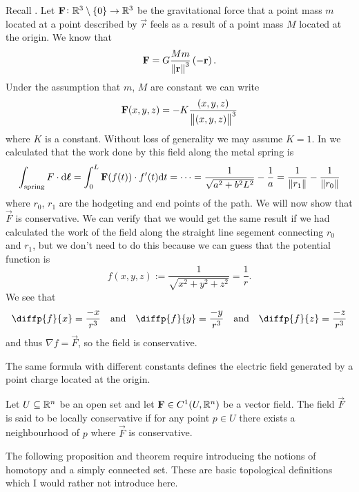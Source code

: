 \documentclass[11pt,a4paper]{article}
\begin{document}
\begin{example}
  Recall .
  Let $\boldsymbol{\mathbf{F}} \colon \mathbb{R}^3 \setminus \left\{0\right\} \to \mathbb{R}^3$ be the gravitational
  force that a point mass $m$ located at a point
  described by $\vec r$ feels as a result of a point mass $M$
  located at the origin.
  We know that
  \[
    \vec F = G \frac{M m}{\norm{\vec r}^3} \del{-\vec r}.
  \]
  Under the assumption that $m$, $M$ are constant we can write
  \[
    \boldsymbol{\mathbf{F}}(x,y,z) = - K \frac{(x,y,z)}{\left\lVert(x,y,z)\right\rVert^3}
  \]
  where $K$ is a constant.
  Without loss of generality we may assume $K = 1$.
  In  we calculated that the work
  done by this field along the metal spring is
  \[
    \int_{\text{spring}} F \cdot \mathrm{d} \boldsymbol{\mathbf{\ell}} =
    \int_{0}^{L} \boldsymbol{\mathbf{F}}(f(t)) \cdot f'(t) \mathrm{d} t = \cdots =
    \frac{1}{\sqrt{a^2 + b^2 L^2}} - \frac{1}{a} =
    \frac{1}{\left\lVert r_1\right\rVert} - \frac{1}{\left\lVert r_0\right\rVert}
  \]
  where $r_0$, $r_1$ are the hodgeting and end points of the path.
  We will now show that $\vec F$ is conservative.
  We can verify that we would get the same result if we
  had calculated the work of the field along the straight line segement
  connecting $r_0$ and $r_1$, but we don't need to do this because
  we can guess that the potential function is
  \[
    f(x,y,z) := \frac{1}{\sqrt{x^2 + y^2 + z^2}} = \frac{1}{r}.
  \]
  We see that
  \[
    \diffp{f}{x} = \frac{-x}{r^3} \tand 
    \diffp{f}{y} = \frac{-y}{r^3} \tand 
    \diffp{f}{z} = \frac{-z}{r^3}
  \]
  and thus $\nabla f = \vec F$, so the field is conservative.
\end{example}
\begin{remark}
  The same formula with different constants defines the electric field
  generated by a point charge located at the origin.
\end{remark}

\begin{definition}
  Let $U \subseteq \mathbb{R}^n$ be an open set and
  let $\boldsymbol{\mathbf{F}} \in C^1(U,\mathbb{R}^n)$ be a vector field.
  The field $\vec F$ is said to be locally conservative if for any point
  $p \in U$ there exists a neighbourhood of $p$ where $\vec F$ is conservative.
\end{definition}

\begin{remark}
  The following proposition and theorem require introducing the notions
  of homotopy and a simply connected set.
  These are basic topological definitions which I would rather not
  introduce here.
\end{remark}
\end{document}
